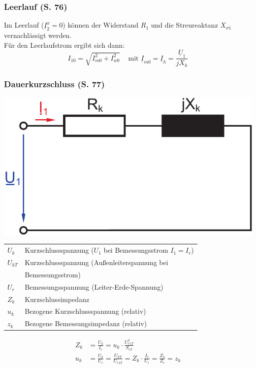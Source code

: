 \documentclass[a4paper,twocolumn,10pt]{article}
\begin{document}
\subsubsection{Leerlauf (S. 76)}
Im Leerlauf ($\underline{I}_2^x=0$) können der Widerstand $R_1$ und die Streureaktanz $X_{\sigma 1}$ vernachlässigt werden.\\
Für den Leerlaufstrom ergibt sich dann:
\begin{equation*}
I_{10}=\sqrt{I_{m0}^2+I_{w0}^2}\;\;\;\text{ mit }\underline{I}_{m0}=\underline{I}_h=\frac{\underline{U}_1}{jX_h}
\end{equation*}

\pagebreak

\subsubsection{Dauerkurzschluss (S. 77)}
\begin{center}
\includegraphics[width=0.6\columnwidth]{Grafiken/Trafo_KS_ESB}
\end{center}
\begin{tabular}{ll}
	$U_k$ & Kurzschlussspannung ($U_1$ bei Bemessungsstrom $I_1=I_r$)\\
	$U_{kT}$ & Kurzschlussspannung (Außenleiterspannung bei\\
	& Bemessungsstrom)\\
	$U_r$ & Bemessungsspannung (Leiter-Erde-Spannung)\\
	$Z_k$ & Kurzschlussimpedanz \\
	$u_k$ & Bezogene Kurzschlussspannung (relativ)\\
	$z_k$ & Bezogene Bemessungsimpedanz (relativ)
\end{tabular}
\begin{equation*}
\begin{split}
Z_k&=\frac{U_k}{I_r}=u_k\cdot\frac{U_{r1T}^2}{S_{rT}}\\
u_k&=\frac{U_k}{U_r}=\frac{U_{kT}}{U_{r1T}}=Z_k\cdot\frac{I_r}{U_r}=\frac{Z_k}{Z_r}=z_k\\
\end{split}
\end{equation*}
\end{document}
